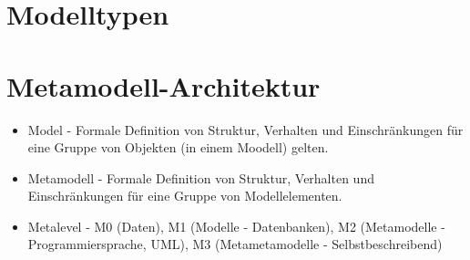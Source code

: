 \section{Modelltypen}

\section{Metamodell-Architektur}
\begin{itemize}
\item Model - Formale Definition von Struktur, Verhalten und Einschränkungen für eine Gruppe von Objekten (in einem Moodell) gelten. 
\item Metamodell - Formale Definition von Struktur, Verhalten und Einschränkungen für eine Gruppe von Modellelementen.
\item Metalevel - M0 (Daten), M1 (Modelle - Datenbanken), M2 (Metamodelle - Programmiersprache, UML), M3 (Metametamodelle - Selbstbeschreibend)
\end{itemize}

